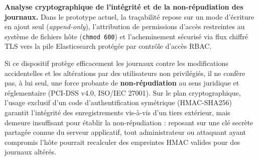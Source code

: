 \textbf{Analyse cryptographique de l'intégrité et de la non-répudiation des journaux.} Dans le prototype actuel, la traçabilité repose sur un mode d'écriture en ajout seul (\textit{append-only}), l'attribution de permissions d'accès restreintes au système de fichiers hôte (\texttt{chmod 600}) et l'acheminement sécurisé via flux chiffré TLS vers la pile Elasticsearch protégée par contrôle d'accès RBAC. 

Si ce dispositif protège efficacement les journaux contre les modifications accidentelles et les altérations par des utilisateurs non privilégiés, il ne confère pas, à lui seul, une force probante de \textbf{non-répudiation} au sens juridique et réglementaire (PCI-DSS v4.0, ISO/IEC 27001). Sur le plan cryptographique, l'usage exclusif d'un code d'authentification symétrique (HMAC-SHA256) garantit l'intégrité des enregistrements vis-à-vis d'un tiers extérieur, mais demeure insuffisant pour établir la non-répudiation : reposant sur une clé secrète partagée connue du serveur applicatif, tout administrateur ou attaquant ayant compromis l'hôte pourrait recalculer des empreintes HMAC valides pour des journaux altérés.

